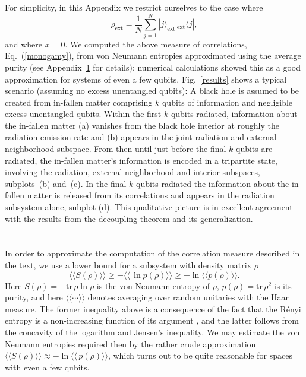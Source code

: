 \documentclass[twocolumn,aps,prl,amsmath,amssymb,floatfix]{revtex4}
\begin{document}
For simplicity, in this Appendix we restrict ourselves to the case
where
\begin{equation}
\rho_{\text{ext}}=\frac{1}{N}\sum_{j=1}^N
 |j\rangle_{\text{ext}}\,{}_{\text{ext}}\!\langle j|,
\end{equation}
and where $x=0$. We computed the above measure of correlations,
Eq.~(\ref{monogamy}), from von Neumann entropies approximated using the
average purity (see Appendix~\ref{purities} for details); numerical
calculations showed this as a good approximation for systems of even a
few qubits. Fig.~\ref{results} shows a typical scenario (assuming no
excess unentangled qubits): A black hole is assumed to be
created from in-fallen matter comprising $k$ qubits of information and
negligible excess unentangled qubits. Within the first $k$ qubits
radiated, information about the in-fallen matter (a) vanishes from the
black hole interior at roughly the radiation emission rate and (b) appears
in the joint radiation and external neighborhood subspace. From then
until just before the final $k$ qubits are radiated, the in-fallen
matter's information is encoded in a tripartite state, involving the
radiation, external neighborhood and interior subspaces, subplots~(b)
and~(c). In the final $k$ qubits radiated the information about the
in-fallen matter is released from its correlations and appears in the
radiation subsystem alone, subplot (d). This qualitative picture is
in excellent agreement with the results from the decoupling
theorem and its generalization.

\section{}
\label{purities}

In order to approximate the computation of the correlation measure
described in the text, we use a lower bound for a subsystem with
density matrix $\rho$
\begin{equation}
\langle\!\langle S(\rho) \rangle\!\rangle
\ge -\langle\!\langle \,\ln p(\rho) \rangle\!\rangle
\ge -\ln \langle\!\langle p(\rho) \rangle\!\rangle. %
\end{equation}
Here $S(\rho)=-{\text{tr}}\, \rho \ln \rho$ is the von Neumann entropy
of $\rho$, $p(\rho)= {\text{tr}}\, \rho^2$ is its purity, and here
$\langle\!\langle \cdots \rangle\!\rangle$ denotes averaging over
random unitaries with the Haar measure. The former inequality above is
a consequence of the fact that the R\'enyi entropy is a non-increasing
function of its argument \cite{Bengtsson06}, and the latter follows from the
concavity of the logarithm and Jensen's inequality. We may estimate
the von Neumann entropies required then by the rather crude
approximation
$\langle\!\langle S(\rho) \rangle\!\rangle
\approx -\ln \langle\!\langle \,p(\rho) \rangle\!\rangle$, 
which turns out to be quite reasonable for spaces with even a few qubits.
\end{document}
